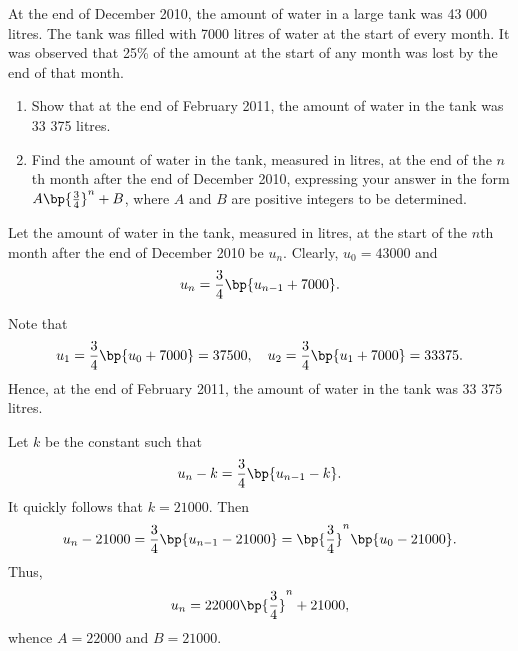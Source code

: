 \begin{problem}
    At the end of December 2010, the amount of water in a large tank was 43 000 litres. The tank was filled with 7000 litres of water at the start of every month. It was observed that 25\% of the amount at the start of any month was lost by the end of that month.

    \begin{enumerate}
        \item Show that at the end of February 2011, the amount of water in the tank was 33 375 litres.
        \item Find the amount of water in the tank, measured in litres, at the end of the $n$th month after the end of December 2010, expressing your answer in the form $A\bp{\frac34}^n + B$, where $A$ and $B$ are positive integers to be determined.
    \end{enumerate}
\end{problem}
\begin{solution}
    \begin{ppart}
        Let the amount of water in the tank, measured in litres, at the start of the $n$th month after the end of December 2010 be $u_n$. Clearly, $u_0 = 43000$ and \[u_n = \frac34 \bp{u_{n-1} + 7000}.\]

        Note that \[u_1 = \frac34 \bp{u_0 + 7000} = 37500, \quad u_2 = \frac34 \bp{u_1 + 7000} = 33375.\] Hence, at the end of February 2011, the amount of water in the tank was 33 375 litres.
    \end{ppart}
    \begin{ppart}
        Let $k$ be the constant such that \[u_n - k = \frac34 \bp{u_{n-1} - k}.\] It quickly follows that $k = 21 000$. Then \[u_n - 21 000 = \frac34 \bp{u_{n-1} - 21 000} = \bp{\frac34}^n \bp{u_0 - 21 000}.\] Thus, \[u_n = 22 000 \bp{\frac34}^n + 21 000,\] whence $A = 22000$ and $B = 21000$.
    \end{ppart}
\end{solution}

